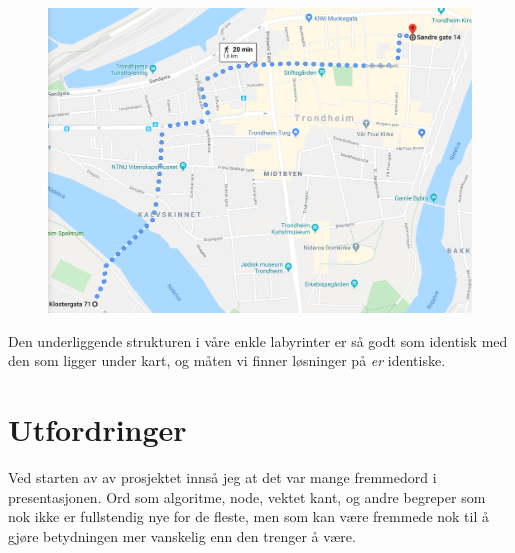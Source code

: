 \documentclass[a5paper]{article}
\begin{document}
\begin{figure}[H]
    \centering
    \includegraphics[width=0.8\linewidth]{google-maps.png}
\end{figure}
Den underliggende strukturen i våre enkle labyrinter er så godt som identisk med den som ligger under kart, og måten vi finner løsninger på \emph{er} identiske.

\section*{Utfordringer}
Ved starten av av prosjektet innså jeg at det var mange fremmedord i presentasjonen. Ord som algoritme, node, vektet kant, og andre begreper som nok ikke er fullstendig nye for de fleste, men som kan være fremmede nok til å gjøre betydningen mer vanskelig enn den trenger å være.
\end{document}
